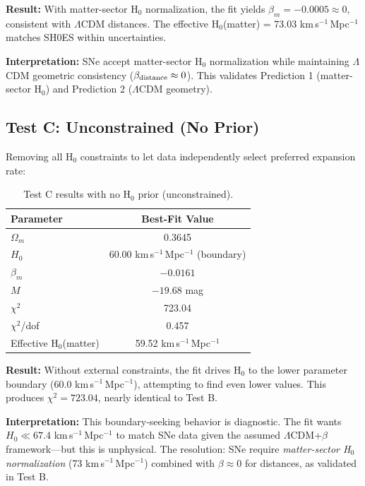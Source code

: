 \documentclass[twocolumn,superscriptaddress,prd,amsmath,amssymb]{revtex4-2}
\begin{document}
\textbf{Result:} With matter-sector H$_0$ normalization, the fit yields $\beta_m = -0.0005 \approx 0$, consistent with $\Lambda$CDM distances. The effective H$_0$(matter) = 73.03 km\,s$^{-1}$\,Mpc$^{-1}$ matches SH0ES within uncertainties.

\textbf{Interpretation:} SNe accept matter-sector H$_0$ normalization while maintaining $\Lambda$CDM geometric consistency ($\beta_{\rm distance} \approx 0$). This validates Prediction 1 (matter-sector H$_0$) and Prediction 2 ($\Lambda$CDM geometry).

\subsection{Test C: Unconstrained (No Prior)}

Removing all H$_0$ constraints to let data independently select preferred expansion rate:

\begin{table}[h]
\centering
\begin{tabular}{lc}
\hline\hline
Parameter & Best-Fit Value \\
\hline
$\Omega_m$ & 0.3645 \\
$H_0$ & 60.00 km\,s$^{-1}$\,Mpc$^{-1}$ (boundary) \\
$\beta_m$ & $-0.0161$ \\
$M$ & $-19.68$ mag \\
\hline
$\chi^2$ & 723.04 \\
$\chi^2$/dof & 0.457 \\
\hline
Effective H$_0$(matter) & 59.52 km\,s$^{-1}$\,Mpc$^{-1}$ \\
\hline\hline
\end{tabular}
\caption{Test C results with no H$_0$ prior (unconstrained).}
\label{tab:test_c}
\end{table}

\textbf{Result:} Without external constraints, the fit drives H$_0$ to the lower parameter boundary (60.0 km\,s$^{-1}$\,Mpc$^{-1}$), attempting to find even lower values. This produces $\chi^2 = 723.04$, nearly identical to Test B.

\textbf{Interpretation:} This boundary-seeking behavior is diagnostic. The fit wants $H_0 \ll 67.4$ km\,s$^{-1}$\,Mpc$^{-1}$ to match SNe data given the assumed $\Lambda$CDM+$\beta$ framework—but this is unphysical. The resolution: SNe require \textit{matter-sector H$_0$ normalization} (73 km\,s$^{-1}$\,Mpc$^{-1}$) combined with $\beta \approx 0$ for distances, as validated in Test B.
\end{document}
